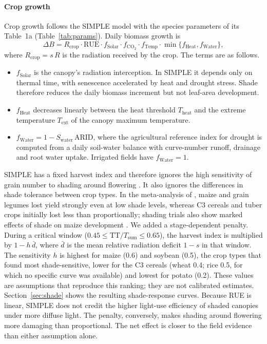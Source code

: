 \paragraph{Crop growth}
Crop growth follows the SIMPLE model \citep{zhao2019} with the species parameters of its Table~1a (Table~\ref{tab:params}). Daily biomass growth is
\begin{equation}
\Delta B = R_{\mathrm{crop}}\cdot \mathrm{RUE}\cdot f_{\mathrm{Solar}}\cdot f_{\mathrm{CO_2}}\cdot f_{\mathrm{Temp}}\cdot \min\{f_{\mathrm{Heat}},f_{\mathrm{Water}}\},
\label{eq:simple}
\end{equation}
where $R_{\mathrm{crop}}=s\,R$ is the radiation received by the crop. The terms are as follows.
\begin{itemize}
\item $f_{\mathrm{Solar}}$ is the canopy's radiation interception. In SIMPLE it depends only on thermal time, with senescence accelerated by heat and drought stress. Shade therefore reduces the daily biomass increment but not leaf-area development.
\item $f_{\mathrm{Heat}}$ decreases linearly between the heat threshold $T_{\mathrm{heat}}$ and the extreme temperature $T_{\mathrm{ext}}$ of the canopy maximum temperature.
\item $f_{\mathrm{Water}}=1-S_{\mathrm{water}}\,\mathrm{ARID}$, where the agricultural reference index for drought \citep{woli2012} is computed from a daily soil-water balance with curve-number runoff, drainage and root water uptake. Irrigated fields have $f_{\mathrm{Water}}=1$.
\end{itemize}

SIMPLE has a fixed harvest index and therefore ignores the high sensitivity of grain number to shading around flowering \citep{fischer1985,andrade1999}. It also ignores the differences in shade tolerance between crop types. In the meta-analysis of \citet{laub2022}, maize and grain legumes lost yield strongly even at low shade levels, whereas C3 cereals and tuber crops initially lost less than proportionally; shading trials also show marked effects of shade on maize development \citep{ramosfuentes2023}. We added a stage-dependent penalty. During a critical window ($0.45\le\mathrm{TT}/T_{\mathrm{sum}}\le0.65$), the harvest index is multiplied by $1-h\,\bar d$, where $\bar d$ is the mean relative radiation deficit $1-s$ in that window. The sensitivity $h$ is highest for maize (0.6) and soybean (0.5), the crop types that \citet{laub2022} found most shade-sensitive, lower for the C3 cereals (wheat 0.4; rice 0.5, for which no specific curve was available) and lowest for potato (0.2). These values are assumptions that reproduce this ranking; they are not calibrated estimates. Section~\ref{sec:shade} shows the resulting shade-response curves. Because RUE is linear, SIMPLE does not credit the higher light-use efficiency of shaded canopies under more diffuse light. The penalty, conversely, makes shading around flowering more damaging than proportional. The net effect is closer to the field evidence than either assumption alone.

